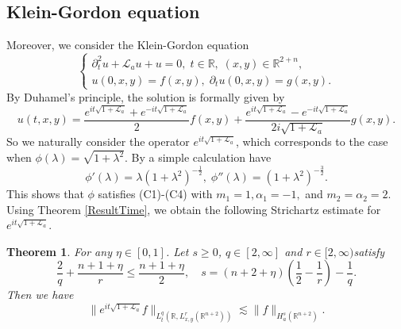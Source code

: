 \documentclass[a4paper,11pt, reqno]{amsart}
\numberwithin{equation}{section}
\theoremstyle{plain}
\newtheorem{theorem}{Theorem}[section]
\theoremstyle{definition}
\theoremstyle{remark}
\begin{document}
\subsection{Klein-Gordon equation}
Moreover, we consider the Klein-Gordon equation
\begin{equation}\label{K-GEqu}
	\begin{cases}
	\partial_t^2u+\mathcal{L}_a u+u=0,\;t\in\mathbb{R},\; (x,y)\in\mathbb{R}^{2+n},\\
	u(0,x,y)=f(x,y),\; \partial_tu(0,x,y)=g(x,y).
	\end{cases}
	\end{equation}
By Duhamel's principle, the solution is formally given by
\begin{equation*}
	u(t,x,y)=\frac{e^{it\sqrt{1+\mathcal{L}_a}}+e^{-it\sqrt{1+\mathcal{L}_a}}}{2}f(x,y)+\frac{e^{it\sqrt{1+\mathcal{L}_a}}-e^{-it\sqrt{1+\mathcal{L}_a}}}{2i\sqrt{1+\mathcal{L}_a}}g(x,y).
	\end{equation*}
So we naturally consider the operator $e^{it\sqrt{1+\mathcal{L}_a}}$, which corresponds to the case when $\phi(\lambda)=\sqrt{1+\lambda^2}$.
By a simple calculation have
	\begin{equation*}
	\phi'(\lambda)=\lambda(1+\lambda^2)^{-\frac{1}{2}}, \;
	\phi''(\lambda)=(1+\lambda^2)^{-\frac{3}{2}}.
	\end{equation*}
This shows that $\phi$ satisfies (C1)-(C4) with $m_1=1,\alpha_1=-1, $ and $m_2=\alpha_2=2$. Using Theorem \ref{ResultTime}, we obtain the following Strichartz estimate for $e^{it\sqrt{1+\mathcal{L}_a}}$.
\begin{theorem}\label{Klein-Gordon estimate}
For any $\eta\in [0,1]$. Let $s\geq0$, $q\in [2,\infty]$ and $r\in [2,\infty)$satisfy
\begin{equation*}
\frac{2}{q}+\frac{n+1+\eta}{r}\leq \frac{n+1+\eta}{2},\quad s=(n+2+\eta)\left(\frac{1}{2}-\frac{1}{r}\right)-\frac{1}{q}.
\end{equation*}
Then we have
\begin{equation*}
\|e^{it\sqrt{1+\mathcal{L}_a}}f\|_{L_t^q(\mathbb{R},L^r_{x,y}(\mathbb{R}^{n+2}))}\lesssim \|f\|_{H^s_a(\mathbb{R}^{n+2})}.
\end{equation*}
\end{theorem}
\end{document}
